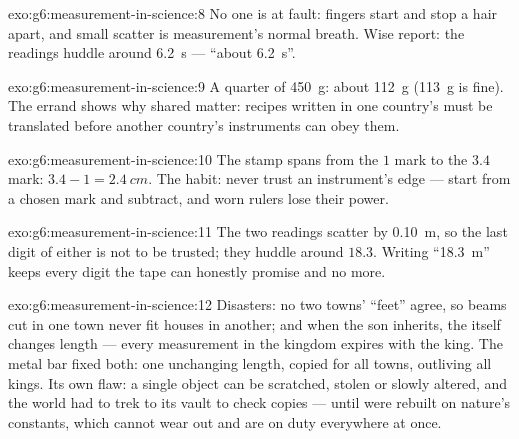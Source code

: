 \begin{solution}{exo:g6:measurement-in-science:8}
No one is at fault: fingers start and stop a hair apart, and small
scatter is measurement's normal breath. Wise report: the readings
huddle around \qty{6.2}{s} --- ``about \qty{6.2}{s}''.
\end{solution}

\begin{solution}{exo:g6:measurement-in-science:9}
A quarter of \qty{450}{g}: about \qty{112}{g} (\qty{113}{g} is
fine). The errand shows why shared  matter: recipes written in
one country's  must be translated before another country's
instruments can obey them.
\end{solution}

\begin{solution}{exo:g6:measurement-in-science:10}
The stamp spans from the $1$ mark to the $3.4$ mark: $3.4 - 1 =
\qty{2.4}{cm}$. The habit: never trust an instrument's edge ---
start from a chosen mark and subtract, and worn rulers lose their
power.
\end{solution}

\begin{solution}{exo:g6:measurement-in-science:11}
The two readings scatter by \qty{0.10}{m}, so the last digit of
either is not to be trusted; they huddle around $18.3$. Writing
``\qty{18.3}{m}'' keeps every digit the tape can honestly promise
and no more.
\end{solution}

\begin{solution}{exo:g6:measurement-in-science:12}
Disasters: no two towns' ``feet'' agree, so beams cut in one town
never fit houses in another; and when the son inherits, the 
itself changes length --- every measurement in the kingdom expires
with the king. The metal bar fixed both: one unchanging length,
copied for all towns, outliving all kings. Its own flaw: a single
object can be scratched, stolen or slowly altered, and the world
had to trek to its vault to check copies --- until  were
rebuilt on nature's constants, which cannot wear out and are on
duty everywhere at once.
\end{solution}

